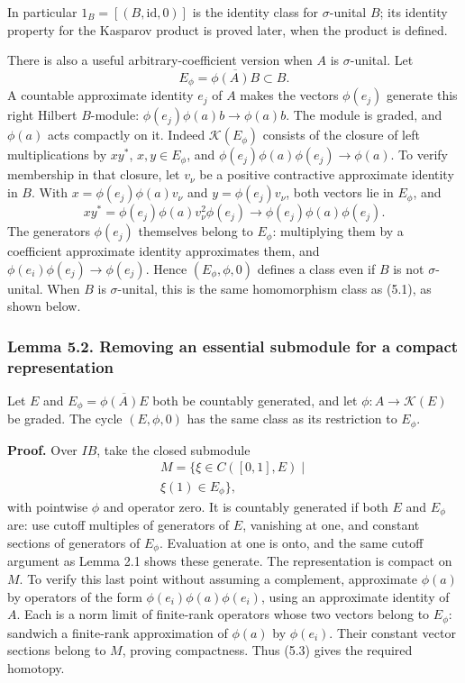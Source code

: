 \documentclass[
  11pt,
]{article}
\begin{document}
In particular \(1_B=[(B,\mathrm{id},0)]\) is the identity class for
\(\sigma\)-unital \(B\); its identity property for the Kasparov product
is proved later, when the product is defined.

There is also a useful arbitrary-coefficient version when \(A\) is
\(\sigma\)-unital. Let \[
E_\phi=\overline{\phi(A)B}\subset B.
\tag{5.2}
\] A countable approximate identity \(e_j\) of \(A\) makes the vectors
\(\phi(e_j)\) generate this right Hilbert \(B\)-module:
\(\phi(e_j)\phi(a)b\to\phi(a)b\). The module is graded, and \(\phi(a)\)
acts compactly on it. Indeed \(\mathcal K(E_\phi)\) consists of the
closure of left multiplications by \(xy^*\), \(x,y\in E_\phi\), and
\(\phi(e_j)\phi(a)\phi(e_j)\to\phi(a)\). To verify membership in that
closure, let \(v_\nu\) be a positive contractive approximate identity in
\(B\). With \(x=\phi(e_j)\phi(a)v_\nu\) and \(y=\phi(e_j)v_\nu\), both
vectors lie in \(E_\phi\), and \[
xy^*=\phi(e_j)\phi(a)v_\nu^2\phi(e_j)
\longrightarrow\phi(e_j)\phi(a)\phi(e_j).
\] The generators \(\phi(e_j)\) themselves belong to \(E_\phi\):
multiplying them by a coefficient approximate identity approximates
them, and \(\phi(e_i)\phi(e_j)\to\phi(e_j)\). Hence \((E_\phi,\phi,0)\)
defines a class even if \(B\) is not \(\sigma\)-unital. When \(B\) is
\(\sigma\)-unital, this is the same homomorphism class as (5.1), as
shown below.

\subsubsection{Lemma 5.2. Removing an essential submodule for a compact
representation}\label{lemma-5.2.-removing-an-essential-submodule-for-a-compact-representation}

Let \(E\) and \(E_\phi=\overline{\phi(A)E}\) both be countably
generated, and let \(\phi:A\to\mathcal K(E)\) be graded. The cycle
\((E,\phi,0)\) has the same class as its restriction to \(E_\phi\).

\textbf{Proof.} Over \(IB\), take the closed submodule \[
\begin{gathered}
M=\{\xi\in C([0,1],E)\mid\\\xi(1)\in E_\phi\},
\end{gathered}
\tag{5.3}
\] with pointwise \(\phi\) and operator zero. It is countably generated
if both \(E\) and \(E_\phi\) are: use cutoff multiples of generators of
\(E\), vanishing at one, and constant sections of generators of
\(E_\phi\). Evaluation at one is onto, and the same cutoff argument as
Lemma 2.1 shows these generate. The representation is compact on \(M\).
To verify this last point without assuming a complement, approximate
\(\phi(a)\) by operators of the form \(\phi(e_i)\phi(a)\phi(e_i)\),
using an approximate identity of \(A\). Each is a norm limit of
finite-rank operators whose two vectors belong to \(E_\phi\): sandwich a
finite-rank approximation of \(\phi(a)\) by \(\phi(e_i)\). Their
constant vector sections belong to \(M\), proving compactness. Thus
(5.3) gives the required homotopy.
\end{document}
